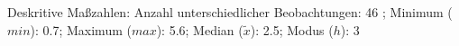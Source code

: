 				\label{tableValues:asch04a}
				\vspace*{-\baselineskip}
                    \begin{noten}
                	    \note{} Deskritive Maßzahlen:
                	    Anzahl unterschiedlicher Beobachtungen: 46%
                	    ; 
                	      Minimum ($min$): 0.7; 
                	      Maximum ($max$): 5.6; 
                	      Median ($\tilde{x}$): 2.5; 
                	      Modus ($h$): 3
                     \end{noten}


